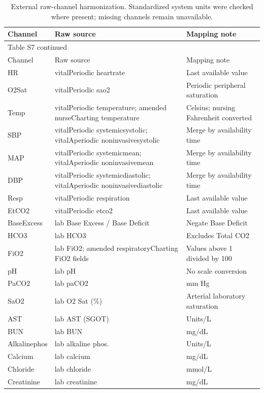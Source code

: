 \small
\renewcommand{\arraystretch}{1.12}
\begin{longtable}{p{.19\linewidth}p{.43\linewidth}p{.30\linewidth}}
\caption{External raw-channel harmonization. Standardized system units were checked where present; missing channels remain unavailable.}\label{tab:smapping}\\
\toprule Channel & Raw source & Mapping note \\ \midrule
\endfirsthead
\multicolumn{3}{l}{Table S7 continued}\\
\toprule Channel & Raw source & Mapping note \\ \midrule
\endhead
\bottomrule\endfoot
HR & vitalPeriodic heartrate & Last available value \\
O2Sat & vitalPeriodic sao2 & Periodic peripheral saturation \\
Temp & vitalPeriodic temperature; amended nurseCharting temperature & Celsius; nursing Fahrenheit converted \\
SBP & vitalPeriodic systemicsystolic; vitalAperiodic noninvasivesystolic & Merge by availability time \\
MAP & vitalPeriodic systemicmean; vitalAperiodic noninvasivemean & Merge by availability time \\
DBP & vitalPeriodic systemicdiastolic; vitalAperiodic noninvasivediastolic & Merge by availability time \\
Resp & vitalPeriodic respiration & Last available value \\
EtCO2 & vitalPeriodic etco2 & Last available value \\
BaseExcess & lab Base Excess / Base Deficit & Negate Base Deficit \\
HCO3 & lab HCO3 & Excludes Total CO2 \\
FiO2 & lab FiO2; amended respiratoryCharting FiO2 fields & Values above 1 divided by 100 \\
pH & lab pH & No scale conversion \\
PaCO2 & lab paCO2 & mm Hg \\
SaO2 & lab O2 Sat (\%) & Arterial laboratory saturation \\
AST & lab AST (SGOT) & Units/L \\
BUN & lab BUN & mg/dL \\
Alkalinephos & lab alkaline phos. & Units/L \\
Calcium & lab calcium & mg/dL \\
Chloride & lab chloride & mmol/L \\
Creatinine & lab creatinine & mg/dL \\

\end{longtable}
